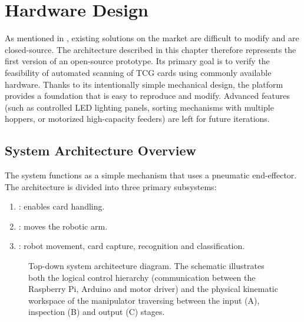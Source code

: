 \chapter{Hardware Design}\label{chap:hw}

As mentioned in , existing solutions on the market are difficult to modify and are closed-source. The architecture described in this chapter therefore represents the first version of an open-source prototype. Its primary goal is to verify the feasibility of automated scanning of \ac{TCG} cards using commonly available hardware. Thanks to its intentionally simple mechanical design, the platform provides a foundation that is easy to reproduce and modify. Advanced features (such as controlled LED lighting panels, sorting mechanisms with multiple hoppers, or motorized high-capacity feeders) are left for future iterations.

\section{System Architecture Overview}
The system functions as a simple  mechanism that uses a pneumatic end-effector. The architecture is divided into three primary subsystems:
\begin{enumerate}
    \item {}: enables card handling.
    \item {}: moves the robotic arm.
    \item {}: robot movement, card capture, recognition and classification.
\end{enumerate}

\begin{figure}[H]
    \centering
    \resizebox{\textwidth}{!}{}
    \caption{Top-down system architecture diagram. The schematic illustrates both the logical control hierarchy (communication between the Raspberry Pi, Arduino and motor driver) and the physical kinematic workspace of the manipulator traversing between the input (A), inspection (B) and output (C) stages.}
    \label{fig:system_overview}
\end{figure}

